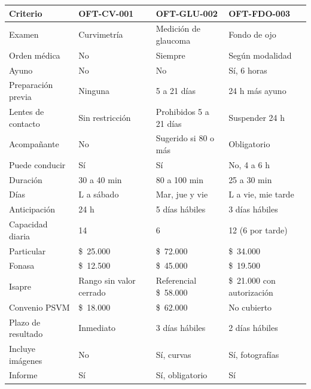 \documentclass[11pt,a4paper]{article}
\newenvironment{CajaDatos}
  {\par\medskip\begin{lrbox}{\boxdatos}%
   \begin{minipage}{0.92\textwidth}\small}
  {\end{minipage}\end{lrbox}%
   \noindent\setlength{\fboxsep}{8pt}\setlength{\fboxrule}{0.8pt}%
   \fcolorbox{colverde}{fondoverde}{\usebox{\boxdatos}}\par\medskip}
\newcommand{\pesos}[1]{\mbox{\$ #1}}
\begin{document}
\begin{CajaDatos}
\begin{center}
\small
\begin{tabularx}{\textwidth}{@{}p{3.7cm}X X X@{}}
\toprule
\rowcolor{fondotabla}\textbf{Criterio} & \textbf{OFT-CV-001} &
\textbf{OFT-GLU-002} & \textbf{OFT-FDO-003} \\
\midrule
Examen & Curvimetría & Medición de glaucoma & Fondo de ojo \\
Orden médica & No & Siempre & Según modalidad \\
Ayuno & No & No & Sí, 6 horas \\
Preparación previa & Ninguna & 5 a 21 días & 24 h más ayuno \\
Lentes de contacto & Sin restricción & Prohibidos 5 a 21 días &
  Suspender 24 h \\
Acompañante & No & Sugerido si 80 o más & Obligatorio \\
Puede conducir & Sí & Sí & No, 4 a 6 h \\
Duración & 30 a 40 min & 80 a 100 min & 25 a 30 min \\
Días & L a sábado & Mar, jue y vie & L a vie, mie tarde \\
Anticipación & 24 h & 5 días hábiles & 3 días hábiles \\
Capacidad diaria & 14 & 6 & 12 (6 por tarde) \\
Particular & \pesos{25.000} & \pesos{72.000} & \pesos{34.000} \\
Fonasa & \pesos{12.500} & \pesos{45.000} & \pesos{19.500} \\
Isapre & Rango sin valor cerrado & Referencial \pesos{58.000} &
  \pesos{21.000} con autorización \\
Convenio PSVM & \pesos{18.000} & \pesos{62.000} & No cubierto \\
Plazo de resultado & Inmediato & 3 días hábiles & 2 días hábiles \\
Incluye imágenes & No & Sí, curvas & Sí, fotografías \\
Informe & Sí & Sí, obligatorio & Sí \\
\bottomrule
\end{tabularx}
\end{center}
\end{CajaDatos}
\end{document}
